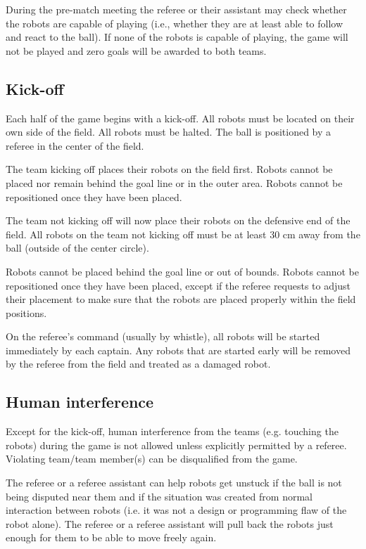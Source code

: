 \documentclass{article}
\begin{document}
During the pre-match meeting the referee or their assistant may
check whether the robots are capable of playing (i.e., whether they are at
least able to follow and react to the ball). If none of the robots is capable
of playing, the game will not be played and zero goals will be awarded to both
teams.

\subsection{Kick-off \label{ref-004}}

Each half of the game begins with a kick-off. All robots must be located on
their own side of the field. All robots must be halted. The ball is positioned
by a referee in the center of the field.

The team kicking off places their robots on the field first. Robots cannot be
placed nor remain behind the goal line or in the outer area. Robots cannot be
repositioned once they have been placed.

The team not kicking off will now place their robots on the defensive end of
the field. All robots on the team not kicking off must be at least 30 cm away
from the ball (outside of the center circle).

Robots cannot be placed behind the goal line or out of bounds.
Robots cannot be repositioned once they have been placed, except if the referee
requests to adjust their placement to make sure that the robots are placed
properly within the field positions.

On the referee's command (usually by whistle), all robots will be started
immediately by each captain. Any robots that are started early will be removed
by the referee from the field and treated as a damaged robot.

\subsection{Human interference\label{ref-005}}

Except for the kick-off, human interference from the teams (e.g. touching the
robots) during the game is not allowed unless explicitly permitted by a
referee. Violating team/team member(s) can be disqualified from the game.

The referee or a referee assistant can help robots get unstuck if the ball
is not being disputed near them and if the situation was created from normal
interaction between robots (i.e. it was not a design or programming flaw of
the robot alone). The referee or a referee assistant will pull back the robots
just enough for them to be able to move freely again.
\end{document}
